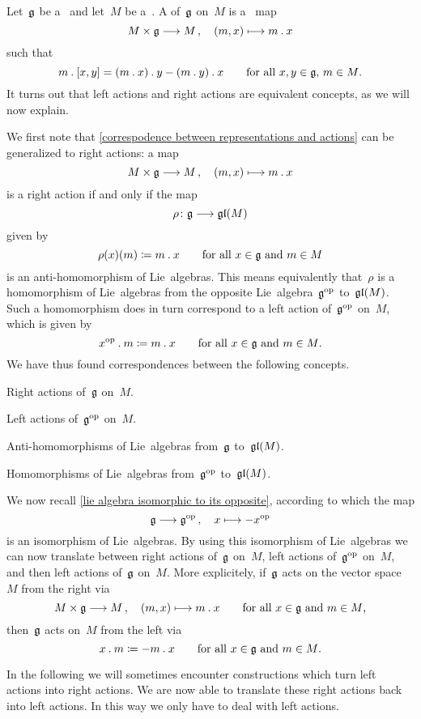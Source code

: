 \begin{remark}
	\label{right representations}
	Let~$\mathfrak{g}$ be a~{\liealgebra{$\kf$}} and let~$M$ be a~\vectorspace{$\kf$}.
	A  of~$\mathfrak{g}$ on~$M$ is a~{\bilinear{$\kf$}} map
	\[
		M \times \glie
		\to
		M \,,
		\quad
		(m,x)
		\mapsto
		m \act x
	\]
	such that
	\begin{equation}
		\label{right action}
		m \mathbin{.} [x,y]
		=
		(m \mathbin{.} x) \mathbin{.} y - (m \mathbin{.} y) \mathbin{.} x
		\qquad
		\text{for all~$x, y \in \mathfrak{g}$,~$m \in M$.}
	\end{equation}
	It turns out that left actions and right actions are equivalent concepts, as we will now explain.

	We first note that \cref{correspodence between representations and actions} can be generalized to right actions:
	a map
	\[
		M \times \glie
		\to
		M \,,
		\quad
		(m,x)
		\mapsto
		m \act x
	\]
	is a right action if and only if the map
	\[
		\rho
		\colon
		\glie
		\to
		\gllie(M)
	\]
	given by
	\[
		\rho(x)(m)
		\coloneqq
		m \mathbin{.} x
		\qquad
		\text{for all~$x \in \mathfrak{g}$ and~$m \in M$}
	\]
	is an anti-homomorphism of Lie~algebras.
	This means equivalently that~$\rho$ is a homomorphism of Lie~algebras from the opposite Lie~algebra~$\mathfrak{g}^{\mathrm{op}}$ to~$\mathfrak{gl}(M)$.
	Such a homomorphism does in turn correspond to a left action of~$\mathfrak{g}^{\mathrm{op}}$ on~$M$, which is given by
	\[
		x^{\mathrm{op}} \mathbin{.} m
		\coloneqq
		m \mathbin{.} x
		\qquad
		\text{for all~$x \in \mathfrak{g}$ and~$m \in M$.}
	\]
	We have thus found {\onetoonetext} correspondences between the following concepts.
	\begin{equivalenceslist*}
		\item
			Right actions of~$\mathfrak{g}$ on~$M$.
		\item
			Left actions of~$\mathfrak{g}^{\mathrm{op}}$ on~$M$.
		\item
			Anti-homomorphisms of Lie~algebras from~$\mathfrak{g}$ to~$\mathfrak{gl}(M)$.
		\item
			Homomorphisms of Lie~algebras from~$\mathfrak{g}^{\mathrm{op}}$ to~$\mathfrak{gl}(M)$.
	\end{equivalenceslist*}

	We now recall \cref{lie algebra isomorphic to its opposite}, according to which the map
	\[
		\glie
		\to
		\glie^{\op} \,,
		\quad
		x
		\mapsto
		-x^{\op}
	\]
	is an isomorphism of Lie~algebras.
	By using this isomorphism of Lie~algebras we can now translate between right actions of~$\mathfrak{g}$ on~$M$, left actions of~$\mathfrak{g}^{\mathrm{op}}$ on~$M$, and then left actions of~$\mathfrak{g}$ on~$M$.
	More explicitely, if~$\mathfrak{g}$ acts on the vector space~$M$ from the right via
	\[
		M \times \glie
		\to
		M \,,
		\quad
		(m,x)
		\mapsto
		m \act x
		\qquad
		\text{for all~$x \in \glie$ and~$m \in M$,}
	\]
	then~$\mathfrak{g}$ acts on~$M$ from the left via
	\[
		x \mathbin{.} m
		\coloneqq
		-m \mathbin{.} x
		\qquad
		\text{for all~$x \in \mathfrak{g}$ and~$m \in M$.}
	\]

	In the following we will sometimes encounter constructions which turn left actions into right actions.
	We are now able to translate these right actions back into left actions.
	In this way we only have to deal with left actions.
\end{remark}





